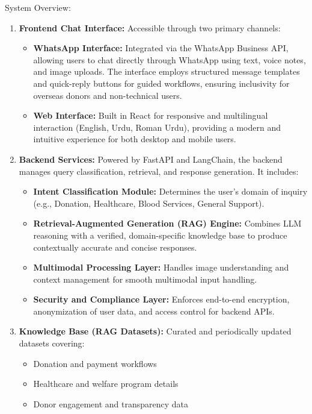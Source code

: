 System Overview:
\begin{enumerate}\setlength{\itemsep}{0pt}
    \item \textbf{Frontend Chat Interface:} Accessible through two primary channels: 
    \begin{itemize}\setlength{\itemsep}{0pt}
        \item \textbf{WhatsApp Interface:} Integrated via the WhatsApp Business API, allowing users to chat directly through WhatsApp using text, voice notes, and image uploads. The interface employs structured message templates and quick-reply buttons for guided workflows, ensuring inclusivity for overseas donors and non-technical users. 
        \item \textbf{Web Interface:} Built in React for responsive and multilingual interaction (English, Urdu, Roman Urdu), providing a modern and intuitive experience for both desktop and mobile users. 
    \end{itemize}
    \item \textbf{Backend Services:} Powered by FastAPI and LangChain, the backend manages query classification, retrieval, and response generation. It includes: 
    \begin{itemize}\setlength{\itemsep}{0pt}
        \item \textbf{Intent Classification Module:} Determines the user’s domain of inquiry (e.g., Donation, Healthcare, Blood Services, General Support). 
        \item \textbf{Retrieval-Augmented Generation (RAG) Engine:} Combines LLM reasoning with a verified, domain-specific knowledge base to produce contextually accurate and concise responses.
        \item \textbf{Multimodal Processing Layer:} Handles image understanding and context management for smooth multimodal input handling. 
        \item \textbf{Security and Compliance Layer:} Enforces end-to-end encryption, anonymization of user data, and access control for backend APIs.
    \end{itemize}
    \item \textbf{Knowledge Base (RAG Datasets):} Curated and periodically updated datasets covering: 
    \begin{itemize}\setlength{\itemsep}{0pt}
        \item Donation and payment workflows 
        \item Healthcare and welfare program details 
        \item Donor engagement and transparency data 

\end{itemize}
\end{enumerate}
